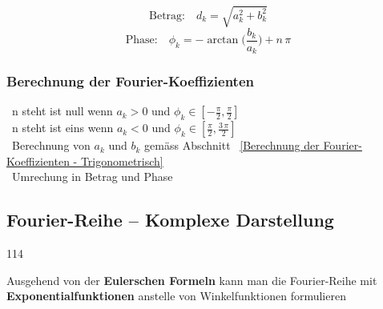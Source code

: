 \vspace{0.2cm}
\begin{minipage}[c]{0.55\columnwidth}
    $$ \text{Betrag:} \quad d_k = \sqrt{a_k^2 + b_k^2} $$
    $$ \text{Phase:} \quad \phi_k = -\arctan \big( \frac{b_k}{a_k} \big) + n \, \pi $$ 
\end{minipage}
\hfill
\begin{minipage}[c]{0.40\columnwidth}
    \centering
\end{minipage}


\subsubsection{Berechnung der Fourier-Koeffizienten}
\textrightarrow\ n steht ist null wenn $a_k > 0$ und $\phi_k \in [-\frac{\pi}{2}, \frac{\pi}{2}]$ \\
\textrightarrow\ n steht ist eins wenn $a_k < 0$ und $\phi_k \in [\frac{\pi}{2}, \frac{3 \, \pi}{2}]$ \\
\textrightarrow\ Berechnung von $a_k$ und $b_k$ gemäss Abschnitt ~\ref{Berechnung der Fourier-Koeffizienten - Trigonometrisch} \\
\textrightarrow\ Umrechung in Betrag und Phase

	
\subsection{Fourier-Reihe -- Komplexe Darstellung}{114}

Ausgehend von der \textbf{Eulerschen Formeln} kann man die Fourier-Reihe mit \textbf{Exponentialfunktionen} anstelle von Winkelfunktionen formulieren

\vspace{0.2cm}


